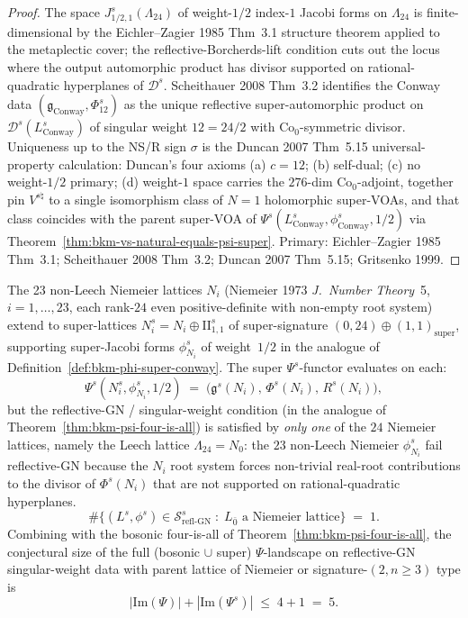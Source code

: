 \begin{proof}
The space $J^{s}_{1/2,1}(\Lambda_{24})$ of weight-$1/2$ index-$1$
Jacobi forms on $\Lambda_{24}$ is finite-dimensional by the
Eichler--Zagier 1985 Thm~3.1 structure theorem applied to the
metaplectic cover; the reflective-Borcherds-lift condition cuts out
the locus where the output automorphic product has divisor
supported on rational-quadratic hyperplanes of $\mathcal D^{s}$.
Scheithauer 2008 Thm~3.2 identifies the Conway data
$(\mathfrak g_{\mathrm{Conway}},\Phi^{s}_{12})$ as the unique
reflective super-automorphic product on
$\mathcal D^{s}(L^{s}_{\mathrm{Conway}})$ of singular weight
$12 = 24/2$ with $\mathrm{Co}_{0}$-symmetric divisor. Uniqueness
up to the NS/R sign $\sigma$ is the Duncan 2007 Thm~5.15
universal-property calculation: Duncan's four axioms (a) $c = 12$;
(b) self-dual; (c) no weight-$1/2$ primary; (d) weight-$1$ space
carries the $276$-dim $\mathrm{Co}_{0}$-adjoint, together pin
$V^{s\natural}$ to a single isomorphism class of $N{=}1$
holomorphic super-VOAs, and that class coincides with the parent
super-VOA of $\Psi^{s}(L^{s}_{\mathrm{Conway}},\phi^{s}_{\mathrm{Conway}},
1/2)$ via Theorem~\ref{thm:bkm-vs-natural-equals-psi-super}.
Primary: Eichler--Zagier 1985 Thm~3.1; Scheithauer 2008 Thm~3.2;
Duncan 2007 Thm~5.15; Gritsenko 1999.
\end{proof}

\begin{conjecture}
\label{conj:bkm-psi-super-niemeier-count}
The 23 non-Leech Niemeier lattices $N_{i}$ (Niemeier 1973
\emph{J.\ Number Theory}~5, $i = 1,\ldots, 23$, each rank-$24$
even positive-definite with non-empty root system) extend to
super-lattices $N_{i}^{s} = N_{i}\oplus\mathrm{II}_{1,1}^{s}$ of
super-signature $(0,24)\oplus(1,1)_{\mathrm{super}}$, supporting
super-Jacobi forms $\phi^{s}_{N_{i}}$ of weight~$1/2$ in the
analogue of Definition~\ref{def:bkm-phi-super-conway}. The super
$\Psi^{s}$-functor evaluates on each:
\[
 \Psi^{s}(N_{i}^{s},\phi^{s}_{N_{i}},1/2)
 \;=\;\bigl(\mathfrak g^{s}(N_{i}),\,\Phi^{s}(N_{i}),\,R^{s}(N_{i})\bigr),
\]
but the reflective-GN / singular-weight condition (in the analogue
of Theorem~\ref{thm:bkm-psi-four-is-all}) is satisfied by
\emph{only one} of the $24$ Niemeier lattices, namely the Leech
lattice $\Lambda_{24} = N_{0}$: the $23$ non-Leech Niemeier
$\phi^{s}_{N_{i}}$ fail reflective-GN because the $N_{i}$ root
system forces non-trivial real-root contributions to the divisor
of $\Phi^{s}(N_{i})$ that are not supported on rational-quadratic
hyperplanes.
\[
 \#\bigl\{(L^{s},\phi^{s})\in\mathcal S^{s}_{\mathrm{refl\text{-}GN}}\;:\;
 L_{\bar 0}\text{ a Niemeier lattice}\bigr\}
 \;=\;1.
\]
Combining with the bosonic four-is-all of
Theorem~\ref{thm:bkm-psi-four-is-all}, the conjectural size of the
full (bosonic $\cup$ super) $\Psi$-landscape on reflective-GN
singular-weight data with parent lattice of Niemeier or
signature-$(2,n\ge 3)$ type is
\[
 |\mathrm{Im}(\Psi)| + |\mathrm{Im}(\Psi^{s})|\;\le\;4 + 1\;=\;5.
\]
\end{conjecture}

